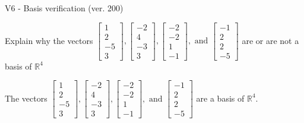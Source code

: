 \begin{exercise}
  \begin{exerciseTitle}V6 - Basis verification (ver. 200)\end{exerciseTitle}
  \begin{exerciseStatement}
    Explain why the vectors \(\left[\begin{array}{r}
1 \\
2 \\
-5 \\
3
\end{array}\right] , \left[\begin{array}{r}
-2 \\
4 \\
-3 \\
3
\end{array}\right] , \left[\begin{array}{r}
-2 \\
-2 \\
1 \\
-1
\end{array}\right] , \text{ and } \left[\begin{array}{r}
-1 \\
2 \\
2 \\
-5
\end{array}\right]\) are or are not a basis of \(\mathbb{R}^4\)	


  \end{exerciseStatement}
  \begin{exerciseAnswer}
   The vectors \(\left[\begin{array}{r}
1 \\
2 \\
-5 \\
3
\end{array}\right] , \left[\begin{array}{r}
-2 \\
4 \\
-3 \\
3
\end{array}\right] , \left[\begin{array}{r}
-2 \\
-2 \\
1 \\
-1
\end{array}\right] , \text{ and } \left[\begin{array}{r}
-1 \\
2 \\
2 \\
-5
\end{array}\right]\) 
  	 are  a basis of \(\mathbb{R}^4\).
  


  \end{exerciseAnswer}
\end{exercise}